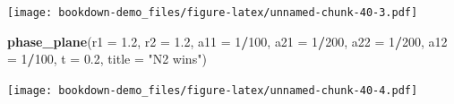 \documentclass[
]{book}
\newenvironment{Shaded}{\begin{snugshade}}{\end{snugshade}}
\newcommand{\AttributeTok}[1]{\textcolor[rgb]{0.13,0.29,0.53}{#1}}
\newcommand{\DecValTok}[1]{\textcolor[rgb]{0.00,0.00,0.81}{#1}}
\newcommand{\FloatTok}[1]{\textcolor[rgb]{0.00,0.00,0.81}{#1}}
\newcommand{\FunctionTok}[1]{\textcolor[rgb]{0.13,0.29,0.53}{\textbf{#1}}}
\newcommand{\NormalTok}[1]{#1}
\newcommand{\SpecialCharTok}[1]{\textcolor[rgb]{0.81,0.36,0.00}{\textbf{#1}}}
\newcommand{\StringTok}[1]{\textcolor[rgb]{0.31,0.60,0.02}{#1}}
\begin{document}
\texttt{[image: bookdown-demo\_files/figure-latex/unnamed-chunk-40-3.pdf]}

\begin{Shaded}
\begin{Highlighting}[]
  \FunctionTok{phase\_plane}\NormalTok{(}\AttributeTok{r1 =} \FloatTok{1.2}\NormalTok{, }\AttributeTok{r2 =} \FloatTok{1.2}\NormalTok{, }
              \AttributeTok{a11 =} \DecValTok{1}\SpecialCharTok{/}\DecValTok{100}\NormalTok{, }\AttributeTok{a21 =} \DecValTok{1}\SpecialCharTok{/}\DecValTok{200}\NormalTok{, }\AttributeTok{a22 =} \DecValTok{1}\SpecialCharTok{/}\DecValTok{200}\NormalTok{, }\AttributeTok{a12 =} \DecValTok{1}\SpecialCharTok{/}\DecValTok{100}\NormalTok{, }
              \AttributeTok{t =} \FloatTok{0.2}\NormalTok{, }\AttributeTok{title =} \StringTok{"N2 wins"}\NormalTok{)}
\end{Highlighting}
\end{Shaded}

\texttt{[image: bookdown-demo\_files/figure-latex/unnamed-chunk-40-4.pdf]}

  
\end{document}
